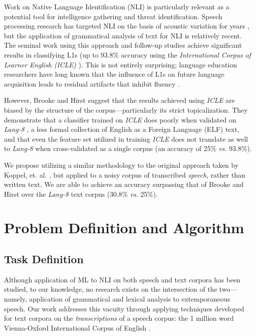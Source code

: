 \documentclass[11pt]{article}
\begin{document}
Work on Native Language Identification (NLI) is particularly relevant as a potential tool for intelligence gathering and threat identification. Speech processing research has targeted NLI on the basis of acoustic variation for years \cite{Kat_Fung_Bay_Kong_1999,Ahmed_Tan_2011}, but the application of grammatical analysis of text for NLI is relatively recent.  The seminal work using this approach \cite{Koppel2005a} and follow-up studies \cite{Tsur2007,Brooke2012} achieve significant results in classifying L1s (up to 93.8\% accuracy using the \emph{International Corpus of Learner English (ICLE)} \cite{ICLEv2}). This is not entirely surprising; language education researchers have long known that the influence of L1s on future language acquisition leads to residual artifacts that inhibit fluency \cite{Mohan_Lo_1985,Yamashita_Jiang_2010}.

However, Brooke and Hirst  suggest that the results achieved using \emph{ICLE} are biased by the structure of the corpus---particularly its strict topicalization. They demonstrate that a classifier trained on \emph{ICLE} does poorly when validated on \emph{Lang-8} , a less formal collection of English as a Foreign Language (ELF) text, and that even the feature set utilized in training \emph{ICLE} does not translate as well to \emph{Lang-8} when cross-validated as a single corpus (an accuracy of 25\% \emph{vs.} 93.8\%).

We propose utilizing a similar methodology to the original approach taken by Koppel, et. al. , but applied to a noisy corpus of transcribed \emph{speech}, rather than written text. We are able to achieve an accuracy surpassing that of Brooke and Hirst over the \emph{Lang-8} text corpus (30.8\% \emph{vs.} 25\%).
\section{Problem Definition and Algorithm}

\subsection{Task Definition}
Although application of ML to NLI on both speech and text corpora has been studied, to our knowledge, no research exists on the intersection of the two---namely, application of grammatical and lexical analysis to extemporaneous speech. Our work addresses this vacuity through applying techniques developed for text corpora on the \emph{transcriptions} of a speech corpus: the 1 million word Vienna-Oxford International Corpus of English \cite{VOICE}. 
\end{document}
